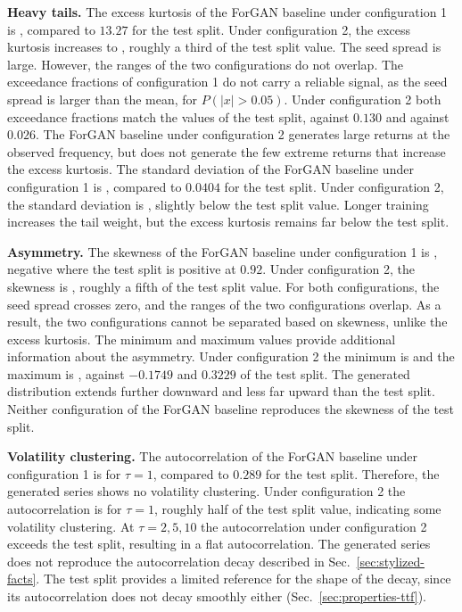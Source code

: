\textbf{Heavy tails.} The excess kurtosis of the ForGAN baseline under configuration 1 is , compared to $13.27$ for the test split. Under configuration 2, the excess kurtosis increases to , roughly a third of the test split value. The seed spread is large. However, the ranges of the two configurations do not overlap.
The exceedance fractions of configuration 1 do not carry a reliable signal, as the seed spread is larger than the mean,  for $P(|x| > 0.05)$. Under configuration 2 both exceedance fractions match the values of the test split,  against $0.130$ and  against $0.026$. The ForGAN baseline under configuration 2 generates large returns at the observed frequency, but does not generate the few extreme returns that increase the excess kurtosis. 
The standard deviation of the ForGAN baseline under configuration 1 is , compared to $0.0404$ for the test split. Under configuration 2, the standard deviation is , slightly below the test split value.
Longer training increases the tail weight, but the excess kurtosis remains far below the test split. 

\textbf{Asymmetry.} The skewness of the ForGAN baseline under configuration 1 is , negative where the test split is positive at $0.92$. Under configuration 2, the skewness is , roughly a fifth of the test split value. For both configurations, the seed spread crosses zero, and the ranges of the two configurations overlap. As a result, the two configurations cannot be separated based on skewness, unlike the excess kurtosis.
The minimum and maximum values provide additional information about the asymmetry. Under configuration 2 the minimum is  and the maximum is , against $-0.1749$ and $0.3229$ of the test split. The generated distribution extends further downward and less far upward than the test split. Neither configuration of the ForGAN baseline reproduces the skewness of the test split. 

\textbf{Volatility clustering.} The autocorrelation of the ForGAN baseline under configuration 1 is  for $\tau=1$, compared to $0.289$ for the test split. Therefore, the generated series shows no volatility clustering. Under configuration 2 the autocorrelation is  for $\tau=1$, roughly half of the test split value, indicating some volatility clustering. At $\tau=2, 5, 10$ the autocorrelation under configuration 2 exceeds the test split, resulting in a flat autocorrelation. The generated series does not reproduce the autocorrelation decay described in Sec.~\ref{sec:stylized-facts}. The test split provides a limited reference for the shape of the decay, since its autocorrelation does not decay smoothly either (Sec.~\ref{sec:properties-ttf}).

